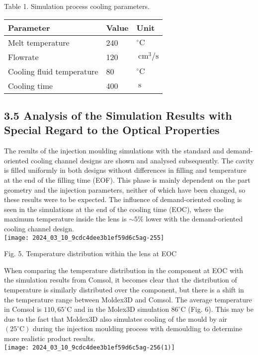 \documentclass[10pt]{article}
\begin{document}
Table 1. Simulation process cooling parameters.

\begin{center}
\begin{tabular}{l|l|l}
\hline
Parameter & Value & Unit \\
\hline
Melt temperature & 240 & ${ }^{\circ} \mathrm{C}$ \\
\hline
Flowrate & 120 & $\mathrm{~cm}^{3} / \mathrm{s}$ \\
\hline
Cooling fluid temperature & 80 & ${ }^{\circ} \mathrm{C}$ \\
\hline
Cooling time & 400 & $\mathrm{~s}$ \\
\hline
\end{tabular}
\end{center}

\subsection*{3.5 Analysis of the Simulation Results with Special Regard to the Optical Properties}
The results of the injection moulding simulations with the standard and demand-oriented cooling channel designs are shown and analysed subsequently. The cavity is filled uniformly in both designs without differences in filling and temperature at the end of the filling time (EOF). This phase is mainly dependent on the part geometry and the injection parameters, neither of which have been changed, so these results were to be expected. The influence of demand-oriented cooling is seen in the simulations at the end of the cooling time (EOC), where the maximum temperature inside the lens is $\sim 5 \%$ lower with the demand-oriented cooling channel design.\\
\texttt{[image: 2024\_03\_10\_9cdc4dee3b1ef59d6c5ag-255]}

Fig. 5. Temperature distribution within the lens at EOC

When comparing the temperature distribution in the component at EOC with the simulation results from Comsol, it becomes clear that the distribution of temperature is similarly distributed over the component, but there is a shift in the temperature range between Moldex3D and Comsol. The average temperature in Comsol is $110,65^{\circ} \mathrm{C}$ and in the Molex3D simulation $86^{\circ} \mathrm{C}$ (Fig. 6). This may be due to the fact that Moldex3D also simulates cooling of the mould by air $\left(25^{\circ} \mathrm{C}\right)$ during the injection moulding process with demoulding to determine more realistic product results.\\
\texttt{[image: 2024\_03\_10\_9cdc4dee3b1ef59d6c5ag-256(1)]}
\end{document}
